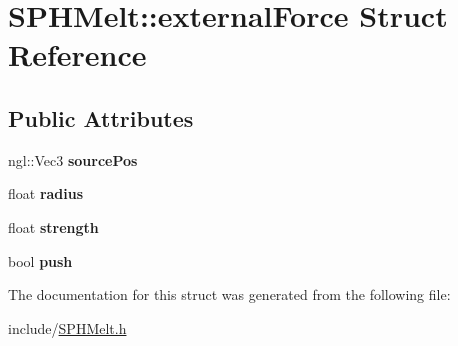 \hypertarget{structSPHMelt_1_1externalForce}{\section{S\-P\-H\-Melt\-:\-:external\-Force Struct Reference}
\label{structSPHMelt_1_1externalForce}
}
\subsection*{Public Attributes}
\begin{DoxyCompactItemize}
\item 
\hypertarget{structSPHMelt_1_1externalForce_a3ceccd334375b5dd084d2f6ae03e8cb7}{ngl\-::\-Vec3 {\bfseries source\-Pos}}\label{structSPHMelt_1_1externalForce_a3ceccd334375b5dd084d2f6ae03e8cb7}

\item 
\hypertarget{structSPHMelt_1_1externalForce_a3c50efb1b589007daffbb75c08a6d510}{float {\bfseries radius}}\label{structSPHMelt_1_1externalForce_a3c50efb1b589007daffbb75c08a6d510}

\item 
\hypertarget{structSPHMelt_1_1externalForce_a6da563e2b7bcdb9875d9bf5de9d2c2cc}{float {\bfseries strength}}\label{structSPHMelt_1_1externalForce_a6da563e2b7bcdb9875d9bf5de9d2c2cc}

\item 
\hypertarget{structSPHMelt_1_1externalForce_acf18cafd17661879fe6e8003cdbee165}{bool {\bfseries push}}\label{structSPHMelt_1_1externalForce_acf18cafd17661879fe6e8003cdbee165}

\end{DoxyCompactItemize}


The documentation for this struct was generated from the following file\-:\begin{DoxyCompactItemize}
\item 
include/\hyperlink{SPHMelt_8h}{S\-P\-H\-Melt.\-h}\end{DoxyCompactItemize}
